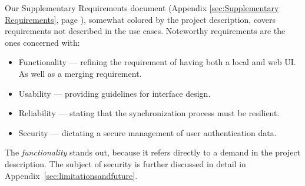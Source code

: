 Our Supplementary Requirements document (Appendix \ref{sec:Supplementary Requirements}, page \pageref{sec:Supplementary Requirements}), somewhat colored by the project description, covers requirements not described in the use cases. 
Noteworthy requirements are the ones concerned with: 
\begin{itemize}
\item Functionality --- refining the requirement of having both a local and web UI. As well as a merging requirement.
\item Usability --- providing guidelines for interface design.
\item Reliability --- stating that the synchronization process must be resilient.
\item Security --- dictating a secure management of user authentication data.
\end{itemize}
The \emph{functionality} stands out, because it refers directly to a demand in the project description.
The subject of security is further discussed in detail in Appendix~\ref{sec:limitationsandfuture}.
